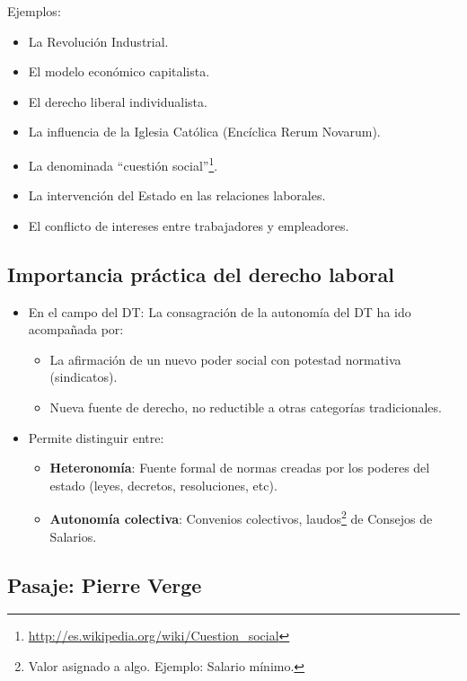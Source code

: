 \documentclass[spanish,12pt,a4paper,titlepage]{report}
\begin{document}
\begin{itemize}
  Ejemplos:
  \begin{itemize}
  \item La Revolución Industrial.
  \item El modelo económico capitalista.
  \item El derecho liberal individualista.
  \item La influencia de la Iglesia Católica (Encíclica Rerum Novarum).
  \item La denominada “cuestión social”\footnote{\url{http://es.wikipedia.org/wiki/Cuestion\_social}}.
  \item La intervención del Estado en las relaciones laborales.
  \item El conflicto de intereses entre trabajadores y empleadores.
  \end{itemize}
\end{itemize}

\subsection{Importancia práctica del derecho laboral}
\label{sec:importancia-practica-del-derecho-laboral}

\begin{itemize}
\item En el campo del DT: La consagración de la autonomía del DT ha ido acompañada por:
  \begin{itemize}
  \item La afirmación de un nuevo poder social con potestad normativa (sindicatos).
  \item Nueva fuente de derecho, no reductible a otras categorías tradicionales.
  \end{itemize}
\item Permite distinguir entre:
  \begin{itemize}
  \item \textbf{Heteronomía}: Fuente formal de normas creadas por los poderes del estado (leyes, decretos, resoluciones, etc).
  \item \textbf{Autonomía colectiva}: Convenios colectivos, laudos\footnote{Valor asignado a algo. Ejemplo: Salario mínimo.} de Consejos de Salarios.
  \end{itemize}
\end{itemize}

\subsection*{Pasaje: Pierre Verge}
\label{pasaje-pierre-verge}
\end{document}
